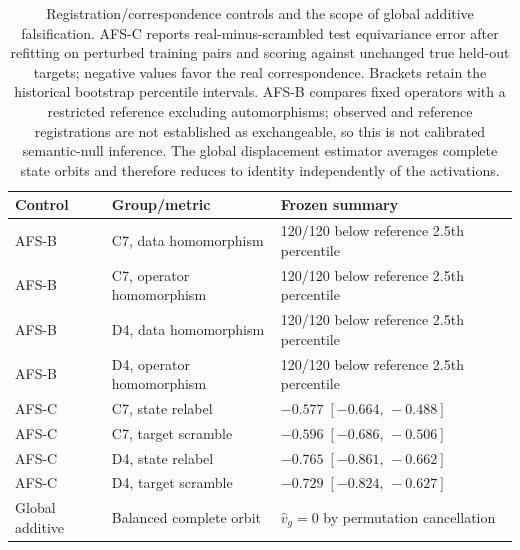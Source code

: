 \begin{table}[t]
\caption{Registration/correspondence controls and the scope of global additive falsification. AFS-C reports real-minus-scrambled test equivariance error after refitting on perturbed training pairs and scoring against unchanged true held-out targets; negative values favor the real correspondence. Brackets retain the historical bootstrap percentile intervals. AFS-B compares fixed operators with a restricted reference excluding automorphisms; observed and reference registrations are not established as exchangeable, so this is not calibrated semantic-null inference. The global displacement estimator averages complete state orbits and therefore reduces to identity independently of the activations.}
\label{tab:diagnostic-controls}
\centering
\small
\begin{tabular}{lll}
\toprule
Control & Group/metric & Frozen summary \\
\midrule
AFS-B & C7, data homomorphism & 120/120 below reference 2.5th percentile \\
AFS-B & C7, operator homomorphism & 120/120 below reference 2.5th percentile \\
AFS-B & D4, data homomorphism & 120/120 below reference 2.5th percentile \\
AFS-B & D4, operator homomorphism & 120/120 below reference 2.5th percentile \\
AFS-C & C7, state relabel & $-0.577\;[-0.664,\,-0.488]$ \\
AFS-C & C7, target scramble & $-0.596\;[-0.686,\,-0.506]$ \\
AFS-C & D4, state relabel & $-0.765\;[-0.861,\,-0.662]$ \\
AFS-C & D4, target scramble & $-0.729\;[-0.824,\,-0.627]$ \\
\midrule
Global additive & Balanced complete orbit & $\widehat v_g=0$ by permutation cancellation \\
\bottomrule
\end{tabular}
\end{table}
